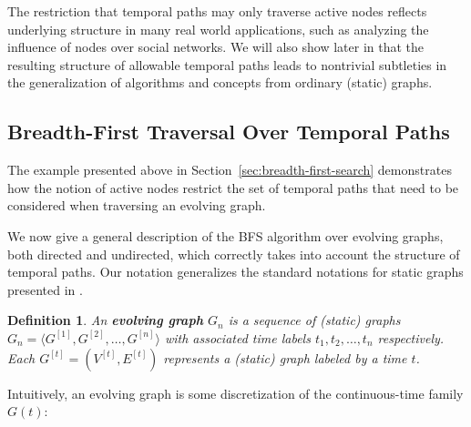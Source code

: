 \documentclass[11pt,conference,compsocconf]{IEEEtran}
\newtheorem{defn}{Definition}
\theoremstyle{definition}
\begin{document}
The restriction that temporal paths may only traverse active nodes reflects
underlying structure in many real world applications, such as analyzing the
influence of nodes over social networks. We will also show later in
that the resulting structure of allowable temporal paths leads to nontrivial
subtleties in the generalization of algorithms and concepts from ordinary
(static) graphs.



\subsection{Breadth-First Traversal Over Temporal Paths}
\label{sec:evolving-graph-bfs}

The example presented above in Section~\ref{sec:breadth-first-search}
demonstrates how the notion of active nodes restrict the set of temporal paths
that need to be considered when traversing an evolving graph.

We now give a general description of the BFS algorithm over evolving graphs,
both directed and undirected, which correctly takes into account the structure
of temporal paths.
Our notation generalizes the standard notations for static graphs presented in
\cite{even12,kegi11}.

\begin{defn}
An \textbf{evolving graph} $G_n$ is a sequence of
(static) graphs
$G_n = \langle G^{[1]}, G^{[2]}, \ldots, G^{[n]} \rangle$ with associated
time labels $t_1, t_2, \ldots, t_n$ respectively.
Each $G^{[t]} = (V^{[t]}, E^{[t]})$ represents a (static) graph labeled by a
time $t$.
\end{defn}

Intuitively, an evolving graph is some discretization of the continuous-time family $G(t)$:

\begin{center}
\end{center}
\end{document}
